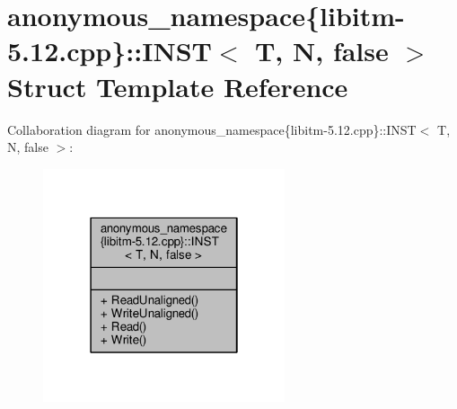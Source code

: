 \hypertarget{structanonymous__namespace_02libitm-5_812_8cpp_03_1_1INST_3_01T_00_01N_00_01false_01_4}{\section{anonymous\-\_\-namespace\{libitm-\/5.12.cpp\}\-:\-:I\-N\-S\-T$<$ T, N, false $>$ Struct Template Reference}
\label{structanonymous__namespace_02libitm-5_812_8cpp_03_1_1INST_3_01T_00_01N_00_01false_01_4}
}


Collaboration diagram for anonymous\-\_\-namespace\{libitm-\/5.12.cpp\}\-:\-:I\-N\-S\-T$<$ T, N, false $>$\-:
\nopagebreak
\begin{figure}[H]
\begin{center}
\leavevmode
\includegraphics[width=202pt]{structanonymous__namespace_02libitm-5_812_8cpp_03_1_1INST_3_01T_00_01N_00_01false_01_4__coll__graph}
\end{center}
\end{figure}
